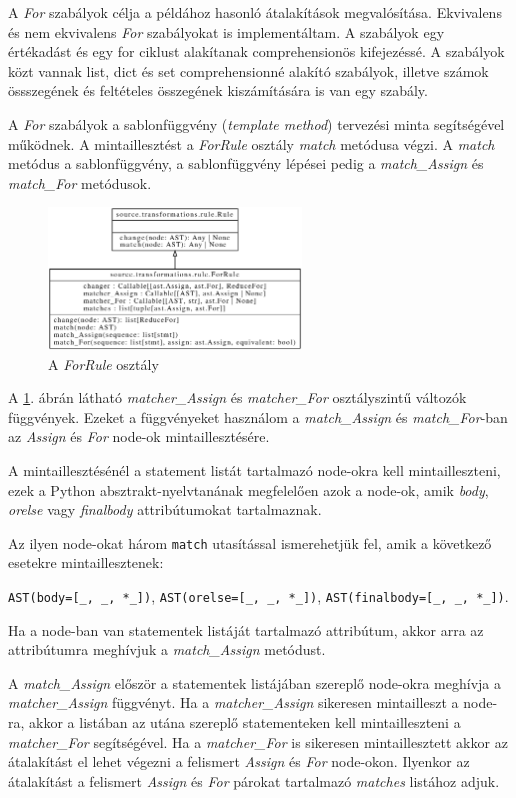 A \emph{For} szabályok célja a példához hasonló átalakítások megvalósítása.
Ekvivalens és nem ekvivalens \emph{For} szabályokat is implementáltam.
A szabályok egy értékadást és egy for ciklust alakítanak comprehensionös kifejezéssé.
A szabályok közt vannak list, dict és set comprehensionné alakító szabályok,
illetve számok össszegének és feltételes összegének kiszámítására is van egy szabály.

A \emph{For} szabályok a sablonfüggvény (\emph{template method})
tervezési minta segítségével működnek.
A mintaillesztést a \emph{ForRule} osztály \emph{match} metódusa végzi.
A \emph{match} metódus a sablonfüggvény,
a sablonfüggvény lépései pedig
a \emph{match\_Assign} és \emph{match\_For} metódusok.

\begin{figure}[H]
	\centering
	\includegraphics[width=0.6\textwidth]{images/uml/ForRule.eps}
	\caption{\label{fig:ForRule}A \emph{ForRule} osztály}
\end{figure}

A \ref{fig:ForRule}. ábrán látható
\emph{matcher\_Assign} és \emph{matcher\_For} osztályszintű változók függvények.
Ezeket a függvényeket használom a
\emph{match\_Assign} és \emph{match\_For}-ban az \emph{Assign} és \emph{For}
node-ok mintaillesztésére.

A mintaillesztésénél a statement listát tartalmazó node-okra kell mintailleszteni,
ezek a Python absztrakt-nyelvtanának megfelelően azok a node-ok,
amik \emph{body}, \emph{orelse} vagy \emph{finalbody} attribútumokat tartalmaznak.

Az ilyen node-okat három \texttt{match} utasítással ismerehetjük fel,
amik a következő esetekre mintaillesztenek:

\lstinline{AST(body=[_, _, *_])},
\lstinline{AST(orelse=[_, _, *_])},
\lstinline{AST(finalbody=[_, _, *_])}.

Ha a node-ban van statementek listáját tartalmazó attribútum,
akkor arra az attribútumra meghívjuk a \emph{match\_Assign} metódust.

A \emph{match\_Assign} először a statementek listájában szereplő
node-okra meghívja a \emph{matcher\_Assign} függvényt.
Ha a \emph{matcher\_Assign} sikeresen mintailleszt a node-ra,
akkor a listában az utána szereplő
statementeken kell mintailleszteni a \emph{matcher\_For} segítségével.
Ha a \emph{matcher\_For} is sikeresen mintaillesztett akkor az átalakítást
el lehet végezni
a felismert \emph{Assign} és \emph{For} node-okon.
Ilyenkor az átalakítást a felismert \emph{Assign} és \emph{For} párokat tartalmazó
\emph{matches} listához adjuk.


